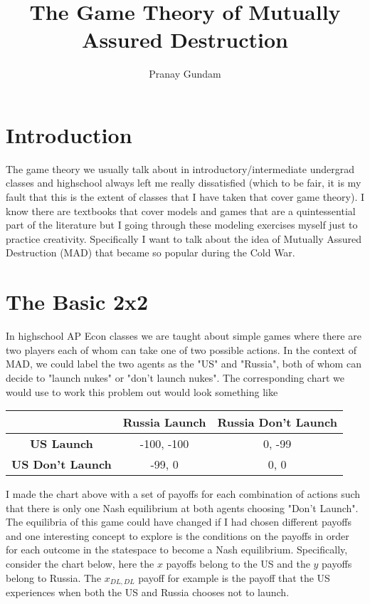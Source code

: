 \documentclass[11pt,english]{article}
\title{\textbf{The Game Theory of Mutually Assured Destruction}}
\author{Pranay Gundam}
\begin{document}
\maketitle

\section*{Introduction}

The game theory we usually talk about in introductory/intermediate undergrad classes and highschool always left me really dissatisfied (which to be fair, it is my fault that this is the extent of classes that I have taken that cover game theory). I know there are textbooks that cover models and games that are a quintessential part of the literature but I going through these modeling exercises myself just to practice creativity. Specifically I want to talk about the idea of Mutually Assured Destruction (MAD) that became so popular during the Cold War.


\section*{The Basic 2x2}
In highschool AP Econ classes we are taught about simple games where there are two players each of whom can take one of two possible actions. In the context of MAD, we could label the two agents as the "US" and "Russia", both of whom can decide to "launch nukes" or "don't launch nukes". The corresponding chart we would use to work this problem out would look something like 

\begin{center}
\begin{tabular}{ c |c |c| }
  & \textbf{Russia Launch} & \textbf{Russia Don't Launch}\\
\hline 
\textbf{US Launch} & -100, -100 & 0, -99  \\
\hline  
\textbf{US Don't Launch} & -99, 0 & 0, 0 \\
\hline
\end{tabular}
\end{center}

\noindent I made the chart above with a set of payoffs for each combination of actions such that there is only one Nash equilibrium at both agents choosing "Don't Launch". The equilibria of this game could have changed if I had chosen different payoffs and one interesting concept to explore is the conditions on the payoffs in order for each outcome in the statespace to become a Nash equilibrium. Specifically, consider the chart below, here the $x$ payoffs belong to the US and the $y$ payoffs belong to Russia. The $x_{DL,DL}$ payoff for example is the payoff that the US experiences when both the US and Russia chooses not to launch.
\end{document}
